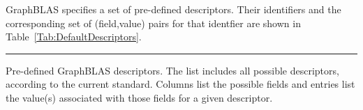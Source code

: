 GraphBLAS specifies a set of pre-defined descriptors. Their identifiers
and the corresponding set of (field,value) pairs for that
identfier are shown in Table~\ref{Tab:DefaultDescriptors}.

\newcommand{\grboutp}{{\sf GrB\_OUTP}}
\newcommand{\grbmask}{{\sf GrB\_MASK}}
\newcommand{\grbinp}[1]{{\sf GrB\_INP#1}}
\newcommand{\grbreplace}{{\sf GrB\_REPLACE}}
\newcommand{\grbstructure}{{\sf GrB\_STRUCTURE}}
\newcommand{\grbscmp}{{\sf GrB\_COMP}}

\newcommand{\grbrepl}{{\sf GrB\_REPLACE}}
\newcommand{\grbstrc}{{\sf GrB\_STRUCTURE}}
\newcommand{\grbcomp}{{\sf GrB\_COMP}}
\newcommand{\grbtran}{{\sf GrB\_TRAN}}

\begin{table}[htbp]
    \hrule
    \begin{center}
	\caption{Pre-defined GraphBLAS descriptors. The list includes
	all possible descriptors, according to the current standard.  Columns list the
    possible fields and entries list the value(s) associated with those fields for
    a given descriptor.}
	\label{Tab:DefaultDescriptors}
~\\
	\begin{small}


\end{small}
\end{center}
\end{table}
